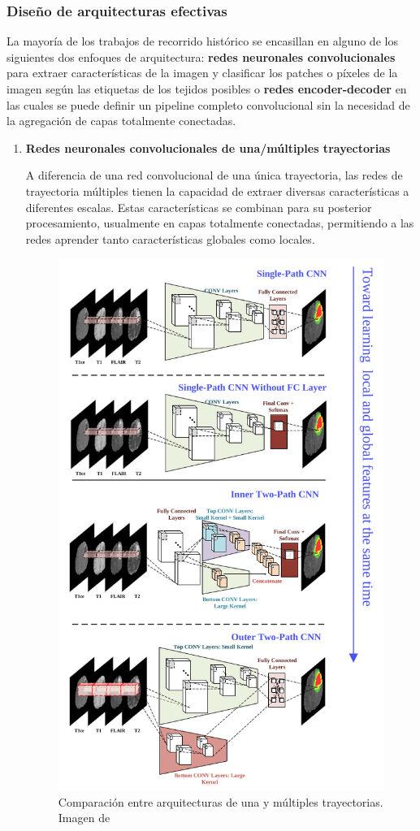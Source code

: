 			\subsubsection{Diseño de arquitecturas efectivas}
			
			La mayoría de los trabajos de recorrido histórico se encasillan en alguno de los siguientes dos enfoques de arquitectura: \textbf{redes neuronales convolucionales} para extraer características de la imagen y clasificar los patches o píxeles de la imagen según las etiquetas de los tejidos posibles o \textbf{redes encoder-decoder} en las cuales se puede definir un pipeline completo convolucional sin la necesidad de la agregación de capas totalmente conectadas.
			
			\begin{enumerate}
					
				\item \textbf{Redes neuronales convolucionales de una/múltiples trayectorias}
					
					
				A diferencia de una red convolucional de una única trayectoria, las redes de trayectoria múltiples tienen la capacidad de extraer diversas características a diferentes escalas. Estas características se combinan para su posterior procesamiento, usualmente en capas totalmente conectadas, permitiendo a las redes aprender tanto características globales como locales. 
				
				\begin{figure}[!h]
					\centering
					\includegraphics[width=0.5\linewidth]{imagenes/comparisonsinglemultipleCNN.png}
					\caption{Comparación entre arquitecturas de una y múltiples trayectorias. Imagen de \cite{liu2023deep}}
				\end{figure}
				

\end{enumerate}
